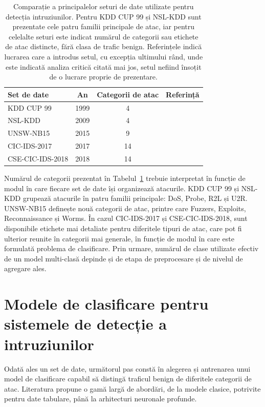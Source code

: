 \begin{table}[!ht]
\caption{Comparație a principalelor seturi de date utilizate pentru detecția intruziunilor. Pentru KDD CUP 99 și NSL-KDD sunt prezentate cele patru familii principale de atac, iar pentru celelalte seturi este indicat numărul de categorii sau etichete de atac distincte, fără clasa de trafic benign. Referințele indică lucrarea care a introdus setul, cu excepția ultimului rând, unde este indicată analiza critică citată mai jos, setul nefiind însoțit de o lucrare proprie de prezentare.}
\centering

\begin{tabular}{lccc}
\hline
\textbf{Set de date} & \textbf{An} & \textbf{Categorii de atac} & \textbf{Referință} \\
\hline
KDD CUP 99       & 1999 & 4  & \cite{tavallaee2009kdd} \\
NSL-KDD          & 2009 & 4  & \cite{tavallaee2009kdd} \\
UNSW-NB15        & 2015 & 9  & \cite{moustafa2015unsw} \\
CIC-IDS-2017     & 2017 & 14 & \cite{sharafaldin2018cicids} \\
CSE-CIC-IDS-2018 & 2018 & 14 & \cite{liu2022error} \\
\hline
\end{tabular}

\label{tab:seturi-date}
\end{table}

Numărul de categorii prezentat în Tabelul~\ref{tab:seturi-date} trebuie interpretat în funcție de modul în care fiecare set de date își organizează atacurile. KDD CUP 99 și NSL-KDD grupează atacurile în patru familii principale: DoS, Probe, R2L și U2R. UNSW-NB15 definește nouă categorii de atac, printre care Fuzzers, Exploits, Reconnaissance și Worms. În cazul CIC-IDS-2017 și CSE-CIC-IDS-2018, sunt disponibile etichete mai detaliate pentru diferitele tipuri de atac, care pot fi ulterior reunite în categorii mai generale, în funcție de modul în care este formulată problema de clasificare. Prin urmare, numărul de clase utilizate efectiv de un model multi-clasă depinde și de etapa de preprocesare și de nivelul de agregare ales.

\section{Modele de clasificare pentru sistemele de detecție a intruziunilor}\label{sec:modele}

Odată ales un set de date, următorul pas constă în alegerea și antrenarea unui model de clasificare capabil să distingă traficul benign de diferitele categorii de atac. Literatura propune o gamă largă de abordări, de la modele clasice, potrivite pentru date tabulare, până la arhitecturi neuronale profunde.

